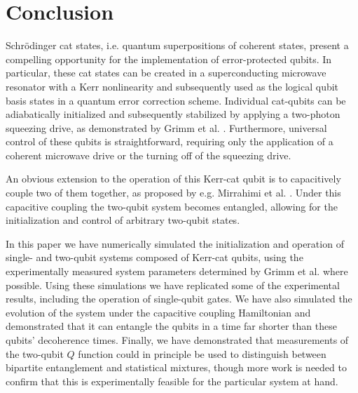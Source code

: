 \section{Conclusion}

Schr\"odinger cat states, i.e. quantum superpositions of coherent states, present a compelling opportunity for the implementation of error-protected qubits.
In particular, these cat states can be created in a superconducting microwave resonator with a Kerr nonlinearity and subsequently used as the logical qubit basis states in a quantum error correction scheme.
Individual cat-qubits can be adiabatically initialized and subsequently stabilized by applying a two-photon squeezing drive, as demonstrated by Grimm et al. \cite{grimm_2020}.
Furthermore, universal control of these qubits is straightforward, requiring only the application of a coherent microwave drive or the turning off of the squeezing drive.

An obvious extension to the operation of this Kerr-cat qubit is to capacitively couple two of them together, as proposed by e.g. Mirrahimi et al. \cite{mirrahimi_2014}.
Under this capacitive coupling the two-qubit system becomes entangled, allowing for the initialization and control of arbitrary two-qubit states.

In this paper we have numerically simulated the initialization and operation of single- and two-qubit systems composed of Kerr-cat qubits, using the experimentally measured system parameters determined by Grimm et al. \cite{grimm_2020} where possible.
Using these simulations we have replicated some of the experimental results, including the operation of single-qubit gates.
We have also simulated the evolution of the system under the capacitive coupling Hamiltonian and demonstrated that it can entangle the qubits in a time far shorter than these qubits' decoherence times.
Finally, we have demonstrated that measurements of the two-qubit $Q$ function could in principle be used to distinguish between bipartite entanglement and statistical mixtures, though more work is needed to confirm that this is experimentally feasible for the particular system at hand.

